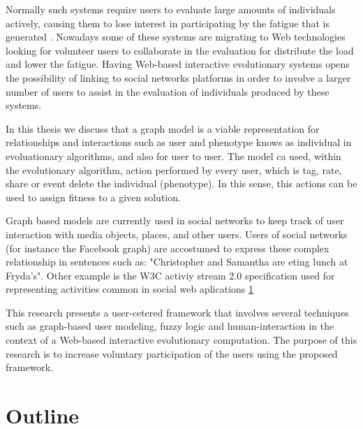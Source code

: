 \par Normally such systems require users to evaluate large amounts of
individuals actively, causing them to lose interest in participating by the
fatigue that is generated \cite{}. Nowadays some of these systems are migrating to
Web technologies looking for volunteer users to collaborate in the evaluation
for distribute the load and lower the fatigue. Having Web-based interactive
evolutionary systems opens the possibility of linking to social networks
platforms in order to involve a larger number of users to assist in the
evaluation of individuals produced by these systems.

\par In this thesis we discuss that a graph model is a viable representation for
relationships and interactions such as user and phenotype knows as individual in
evoluationary algorithms, and also for user to user. The model ca used, within
the evolutionary algorithm, action performed by every user, which is tag, rate,
share or event delete the individual (phenotype). In this sense, this actions
can be used to assign fitness to a given solution.

\par Graph based models are currently used in social networks to keep track of
user interaction with media objects, places, and other users. Users of social
networks (for instance the Facebook graph) are accostumed to express these
complex relationship in sentences such as: "Christopher and Samantha are eting
lunch at Fryda's". Other example is the W3C activiy stream 2.0 specification
used for representing activities common in social web aplications \ref{}

\par This research presents a user-cetered framework that involves several
techniques such as graph-based user modeling, fuzzy logic and human-interaction
in the context of a Web-based interactive evolutionary computation. The purpose
of this research is to increase voluntary participation of the users  using the
proposed framework.

\section{Outline}

